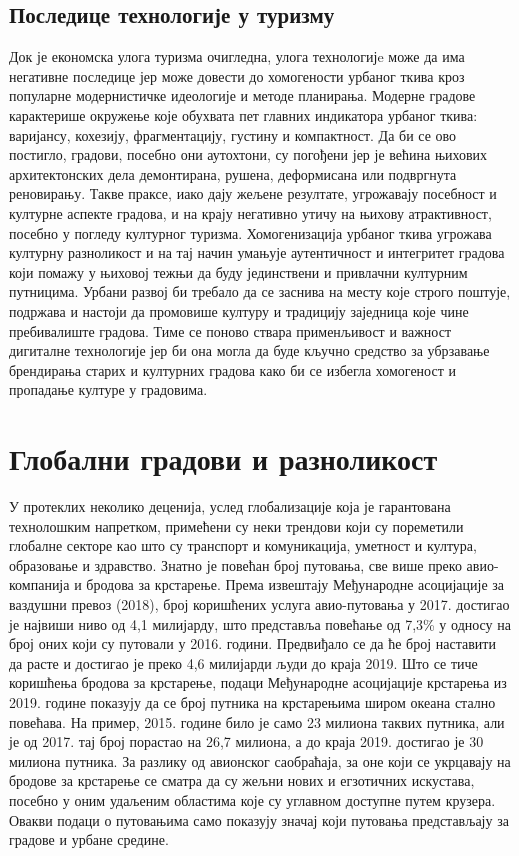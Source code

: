\documentclass{article}
\begin{document}
\subsection{Последице технологије у туризму}
Док је економска улога туризма очигледна, улога технологијe може да има негативне последице јер може довести до хомогености урбаног ткива кроз популарне модернистичке идеологије и методе планирања. Модерне градове карактерише окружење које обухвата пет главних индикатора урбаног ткива: варијансу, кохезију, фрагментацију, густину и компактност. Да би се ово постигло, градови, посебно они аутохтони, су погођени јер је већина њихових архитектонских дела демонтирана, рушена, деформисана или подвргнута реновирању. Такве праксе, иако дају жељене резултате, угрожавају посебност и културне аспекте градова, и на крају негативно утичу на њихову атрактивност, посебно у погледу културног туризма. Хомогенизација урбаног ткива угрожава културну разноликост и на тај начин умањује аутентичност и интегритет градова који помажу у њиховој тежњи да буду јединствени и привлачни културним путницима. Урбани развој би требало да се заснива на месту које строго поштује, подржава и настоји да промовише културу и традицију заједница које чине пребивалиште градова. Тиме се поново ствара применљивост и важност дигиталне технологије јер би она могла да буде кључно средство за убрзавање брендирања старих и културних градова како би се избегла хомогеност и пропадање културе у градовима.

\section{Глобални градови и разноликост}

У протеклих неколико деценија, услед глобализације која је гарантована технолошким напретком, примећени су неки трендови који су пореметили глобалне секторе као што су транспорт и комуникација, уметност и култура, образовање и здравство. Знатно је повећан број путовања, све више преко авио-компанија и бродова за крстарење. Према извештају Међународне асоцијације за ваздушни превоз (2018), број коришћених услуга авио-путовања у 2017. достигао је највиши ниво од 4,1 милијарду, што представља повећање од 7,3\% у односу на број оних који су путовали у 2016. години. Предвиђало се да ће број наставити да расте и достигао је преко 4,6 милијарди људи до краја 2019. Што се тиче коришћења бродова за крстарење, подаци Међународне асоцијације крстарења из 2019. године показују да се број путника на крстарењима широм океана стално повећава. На пример, 2015. године било је само 23 милиона таквих путника, али је од 2017. тај број порастао на 26,7 милиона, а до краја 2019. достигао је 30 милиона путника. За разлику од авионског саобраћаја, за оне који се укрцавају на бродове за крстарење се сматра да су жељни нових и егзотичних искустава, посебно у оним удаљеним областима које су углавном доступне путем крузера. Овакви подаци о путовањима само показују значај који путовања представљају за градове и урбане средине.
\end{document}
